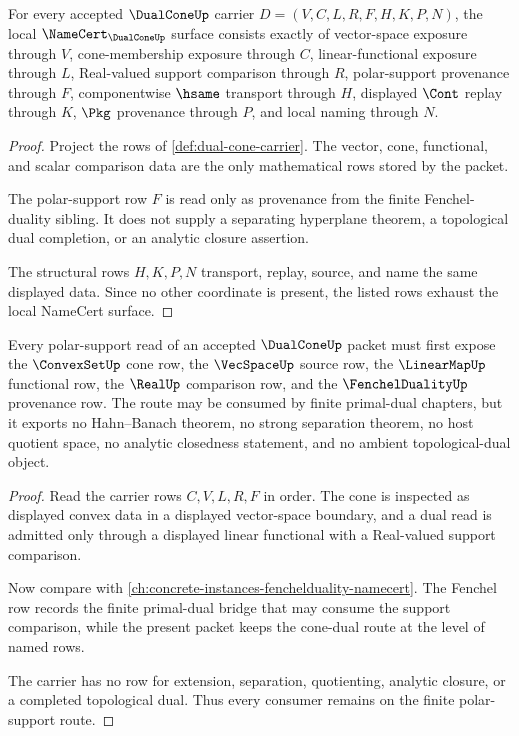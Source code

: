 \begin{theorem}
\label{thm:dual-cone-namecert-obligations}
For every accepted $\DualConeUp$ carrier $D=(V,C,L,R,F,H,K,P,N)$, the local $\NameCert_{\DualConeUp}$ surface consists exactly of vector-space exposure through $V$, cone-membership exposure through $C$, linear-functional exposure through $L$, Real-valued support comparison through $R$, polar-support provenance through $F$, componentwise $\hsame$ transport through $H$, displayed $\Cont$ replay through $K$, $\Pkg$ provenance through $P$, and local naming through $N$.
\end{theorem}
\begin{proof}
Project the rows of \autoref{def:dual-cone-carrier}. The vector, cone, functional, and scalar comparison data are the only mathematical rows stored by the packet.

The polar-support row $F$ is read only as provenance from the finite Fenchel-duality sibling. It does not supply a separating hyperplane theorem, a topological dual completion, or an analytic closure assertion.

The structural rows $H,K,P,N$ transport, replay, source, and name the same displayed data. Since no other coordinate is present, the listed rows exhaust the local NameCert surface.
\end{proof}

\begin{theorem}
\label{thm:dual-cone-polar-support-route}
Every polar-support read of an accepted $\DualConeUp$ packet must first expose the $\ConvexSetUp$ cone row, the $\VecSpaceUp$ source row, the $\LinearMapUp$ functional row, the $\RealUp$ comparison row, and the $\FenchelDualityUp$ provenance row. The route may be consumed by finite primal-dual chapters, but it exports no Hahn--Banach theorem, no strong separation theorem, no host quotient space, no analytic closedness statement, and no ambient topological-dual object.
\end{theorem}
\begin{proof}
Read the carrier rows $C,V,L,R,F$ in order. The cone is inspected as displayed convex data in a displayed vector-space boundary, and a dual read is admitted only through a displayed linear functional with a Real-valued support comparison.

Now compare with \autoref{ch:concrete-instances-fenchelduality-namecert}. The Fenchel row records the finite primal-dual bridge that may consume the support comparison, while the present packet keeps the cone-dual route at the level of named rows.

The carrier has no row for extension, separation, quotienting, analytic closure, or a completed topological dual. Thus every consumer remains on the finite polar-support route.
\end{proof}

